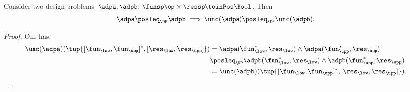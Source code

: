 \begin{lemma}
    Consider two design problems~$\adpa,\adpb\colon \funsp\op \times \ressp \toinPos \Bool$. Then
    \begin{equation}
        \adpa\posleq_{\DP}\adpb\implies \unc(\adpa)\posleq_{\DP}\unc(\adpb).
    \end{equation}
\end{lemma}
\begin{proof}
    One has:
    \begin{equation}
        \begin{aligned}
            \unc(\adpa)(\tup{[\fun_{\low},\fun_{\upp}]^*,[\res_{\low},\res_{\upp}]})&=\adpa(\fun_{\low}^*,\res_{\low})\wedge  \adpa(\fun_{\upp}^*,\res_{\upp})\\
            &\posleq_{\DP}\adpb(\fun_{\low}^*,\res_{\low})\wedge  \adpb(\fun_{\upp}^*,\res_{\upp})\\
            &=\unc(\adpb)(\tup{[\fun_{\low},\fun_{\upp}]^*,[\res_{\low},\res_{\upp}]}).
        \end{aligned}
    \end{equation}
\end{proof}




